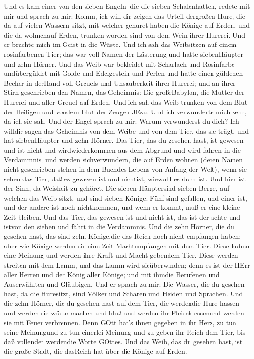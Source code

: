  Und es kam einer von den sieben Engeln, die die sieben
Schalenhatten, redete mit mir und sprach zu mir: Komm, ich will dir
zeigen das Urteil dergroßen Hure, die da auf vielen Wassern sitzt,
 mit welcher gehuret haben die Könige auf Erden, und die da
wohnenauf Erden, trunken worden sind von dem Wein ihrer Hurerei.
 Und er brachte mich im Geist in die Wüste. Und ich sah das
Weibsitzen auf einem rosinfarbenen Tier; das war voll Namen der
Lästerung und hatte siebenHäupter und zehn Hörner.  Und das
Weib war bekleidet mit Scharlach und Rosinfarbe undübergüldet mit Golde
und Edelgestein und Perlen und hatte einen güldenen Becher in derHand
voll Greuels und Unsauberkeit ihrer Hurerei;  und an ihrer
Stirn geschrieben den Namen, das Geheimnis: Die großeBabylon, die Mutter
der Hurerei und aller Greuel auf Erden.  Und ich sah das
Weib trunken von dem Blut der Heiligen und vondem Blut der Zeugen JEsu.
Und ich verwunderte mich sehr, da ich sie sah.  Und der
Engel sprach zu mir: Warum verwunderst du dich? Ich willdir sagen das
Geheimnis von dem Weibe und von dem Tier, das sie trägt, und hat
siebenHäupter und zehn Hörner.  Das Tier, das du gesehen
hast, ist gewesen und ist nicht und wirdwiederkommen aus dem Abgrund und
wird fahren in die Verdammnis, und werden sichverwundern, die auf Erden
wohnen (deren Namen nicht geschrieben stehen in dem Buchdes Lebens von
Anfang der Welt), wenn sie sehen das Tier, daß es gewesen ist und
nichtist, wiewohl es doch ist.  Und hier ist der Sinn, da
Weisheit zu gehöret. Die sieben Häuptersind sieben Berge, auf welchen
das Weib sitzt, und sind sieben Könige.  Fünf sind
gefallen, und einer ist, und der andere ist noch nichtkommen, und wenn
er kommt, muß er eine kleine Zeit bleiben.  Und das Tier,
das gewesen ist und nicht ist, das ist der achte und istvon den sieben
und fährt in die Verdammnis.  Und die zehn Hörner, die du
gesehen hast, das sind zehn Könige,die das Reich noch nicht empfangen
haben; aber wie Könige werden sie eine Zeit Machtempfangen mit dem Tier.
 Diese haben eine Meinung und werden ihre Kraft und Macht
gebendem Tier.  Diese werden streiten mit dem Lamm, und das
Lamm wird sieüberwinden; denn es ist der HErr aller Herren und der König
aller Könige; und mit ihmdie Berufenen und Auserwählten und Gläubigen.
 Und er sprach zu mir: Die Wasser, die du gesehen hast, da
die Huresitzt, sind Völker und Scharen und Heiden und Sprachen.
 Und die zehn Hörner, die du gesehen hast auf dem Tier, die
werdendie Hure hassen und werden sie wüste machen und bloß und werden
ihr Fleisch essenund werden sie mit Feuer verbrennen.  Denn
GOtt hat's ihnen gegeben in ihr Herz, zu tun seine Meinungund zu tun
einerlei Meinung und zu geben ihr Reich dem Tier, bis daß vollendet
werdendie Worte GOttes.  Und das Weib, das du gesehen hast,
ist die große Stadt, die dasReich hat über die Könige auf Erden.

